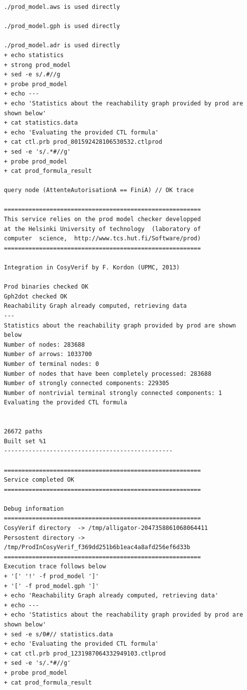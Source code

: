 \documentclass[a4paper,11pt]{report}
\begin{document}
\begin{verbatim}
./prod_model.aws is used directly

./prod_model.gph is used directly

./prod_model.adr is used directly
+ echo statistics
+ strong prod_model
+ sed -e s/.#//g
+ probe prod_model
+ echo ---
+ echo 'Statistics about the reachability graph provided by prod are shown below'
+ cat statistics.data
+ echo 'Evaluating the provided CTL formula'
+ cat ctl.prb prod_801592428106530532.ctlprod
+ sed -e 's/.*#//g'
+ probe prod_model
+ cat prod_formula_result

query node (AttenteAutorisationA == FiniA) // OK trace

========================================================
This service relies on the prod model checker developped
at the Helsinki University of technology  (laboratory of
computer  science,  http://www.tcs.hut.fi/Software/prod)
========================================================

Integration in CosyVerif by F. Kordon (UPMC, 2013)

Prod binaries checked OK
Gph2dot checked OK
Reachability Graph already computed, retrieving data
---
Statistics about the reachability graph provided by prod are shown below
Number of nodes: 283688
Number of arrows: 1033700
Number of terminal nodes: 0
Number of nodes that have been completely processed: 283688
Number of strongly connected components: 229305
Number of nontrivial terminal strongly connected components: 1
Evaluating the provided CTL formula


26672 paths
Built set %1
------------------------------------------------

========================================================
Service completed OK
========================================================

Debug information
========================================================
CosyVerif directory  -> /tmp/alligator-2047358861068064411
Persostent directory -> /tmp/ProdInCosyVerif_f369dd251b6b1eac4a8afd256ef6d33b
========================================================
Execution trace follows below
+ '[' '!' -f prod_model ']'
+ '[' -f prod_model.gph ']'
+ echo 'Reachability Graph already computed, retrieving data'
+ echo ---
+ echo 'Statistics about the reachability graph provided by prod are shown below'
+ sed -e s/0#// statistics.data
+ echo 'Evaluating the provided CTL formula'
+ cat ctl.prb prod_1231987064332949103.ctlprod
+ sed -e 's/.*#//g'
+ probe prod_model
+ cat prod_formula_result


\end{verbatim}
\end{document}
